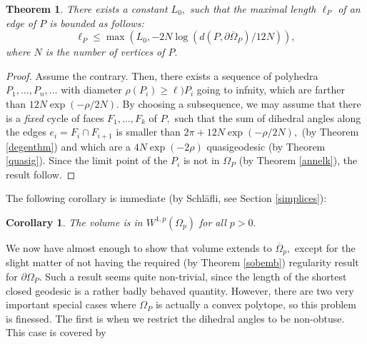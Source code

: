 \documentclass[12pt]{amsart}
\newtheorem{theorem}{Theorem}
\newtheorem{corollary}{Corollary}
\theoremstyle{remark}
\begin{document}
\begin{theorem}
\label{loggrowth}
There exists a constant $L_0,$ such that 
the maximal length $\ell_P$ of an edge of $P$ is bounded as follows:
\[
\ell_P \leq \max(L_0,  - 2N \log(d(P, \partial \overline{\Omega}_P)/12N)),
\]
where $N$ is the number of vertices of $P.$
\end{theorem}
\begin{proof}
Assume the contrary. Then, there exists a sequence of polyhedra $P_1, \dots, P_n, \dots$ with diameter $\rho(P_i) \geq \ell){P_i}$ going to infnity, which are farther than $12 N  \exp(-\rho/2N).$ By choosing a subsequence, we may assume that there is a \emph{fixed} cycle of faces $F_1, \dots, F_k$ of $P,$ such that the sum of dihedral angles along the edges $e_i = F_i \cap F_{i+1}$ is smaller than $2\pi + 12 N  \exp(-\rho/2N),$ (by Theorem \ref{degenthm}) and which are a $4N\exp(-2\rho)$ quasigeodesic (by Theorem \ref{quasig}). Since the limit point of the $P_i$ is not in $\Omega_P$ (by Theorem \ref{annelk}),
the result follow.
\end{proof}
The following corollary is immediate (by Schl\"afli, see Section \ref{simplices}):
\begin{corollary}
\label{lpest}
The volume is in $W^{1, p}(\Omega_p)$ for \emph{all} $p > 0.$
\end{corollary}
We now have almost enough to show that volume extends to $\overline{\Omega}_p,$ except for the slight matter of not having the required (by Theorem \ref{sobemb}) regularity result for $\partial{\Omega}_P.$ Such a result seems quite non-trivial, since the length of the shortest closed geodesic is a rather badly behaved quantity. However, there are two very important special cases where  $\Omega_P$ is actually a convex polytope, so this problem is finessed. The first is when we restrict the dihedral angles to be non-obtuse. This case is covered by 
\end{document}
